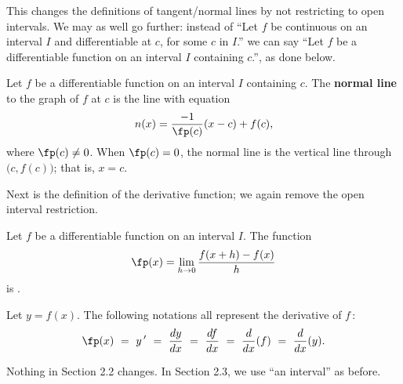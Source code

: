 \documentclass{article}
\begin{document}

This changes the definitions of tangent/normal lines by not restricting to open intervals. We may as well go further: instead of ``Let $f$ be continuous on an  interval $I$ and differentiable at $c$, for some $c$ in $I$.'' we can say ``Let $f$ be a differentiable function on an interval $I$ containing $c$.'', as done below.


{Let $f$ be a differentiable function on an interval $I$ containing $c$. The \textbf{normal line} to the graph of $f$ at $c$ is the line with equation
$$n(x) =\frac{-1}{\fp(c)}(x-c)+f(c),$$ where $\fp(c)\neq 0$. When $\fp(c)=0$, the normal line is the vertical line through $\big(c,f(c)\big)$; that is, $x=c$.
}

Next is the definition of the derivative function; we again remove the open interval restriction.

{Let $f$ be a differentiable function on an  interval $I$. The function $$\fp(x) = \lim_{h\to 0} \frac{f(x+h)-f(x)}{h}$$ is .\\


Let $y = f(x)$. The following notations all represent the derivative of $f$\,:
$$\fp(x)\ =\ y\,'\ =\ \frac{dy}{dx}\ =\ \frac{df}{dx}\ =\ \frac{d}{dx}(f)\ =\ \frac{d}{dx}(y). $$}

Nothing in Section 2.2 changes. In Section 2.3, we use ``an interval'' as before. 
\end{document}
